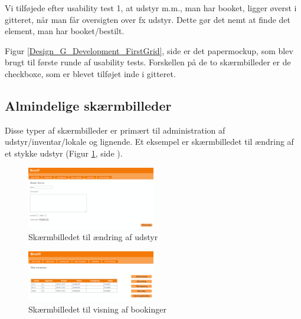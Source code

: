 Vi tilføjede efter usability test 1, at udstyr m.m., man har booket, ligger øverst i gitteret, når man får oversigten over fx udstyr. Dette gør det nemt at finde det element, man har booket/bestilt.

Figur \ref{Design_G_Development_FirstGrid}, side \pageref{Design_G_Development_FirstGrid} er det papermockup, som blev brugt til første runde af usability tests. Forskellen på de to skærmbilleder er de checkboxe, som er blevet tilføjet inde i gitteret. 

\subsection{Almindelige skærmbilleder}
\label{Design_G_Development_NormalWindows}
Disse typer af skærmbilleder er primært til administration af udstyr/inventar/lokale og lignende. Et eksempel er skærmbilledet til ændring af et stykke udstyr (Figur \ref{Design_G_Development_EquipmentChange}, side \pageref{Design_G_Development_EquipmentChange}). 

\begin{figure}[h!]
  \centering
    \includegraphics[width=0.5\textwidth]{Appendix/GUI-Prototype/DigitalMockup/AendreUdstyr}
  \caption{Skærmbilledet til ændring af udstyr}
\label{Design_G_Development_EquipmentChange}
\end{figure} 

\begin{figure}[h!]
  \centering
    \includegraphics[width=0.5\textwidth]{Appendix/GUI-Prototype/DigitalMockup/DineBookinger}
  \caption{Skærmbilledet til visning af bookinger}
\label{Design_G_Development_YourBookings}
\end{figure} 

